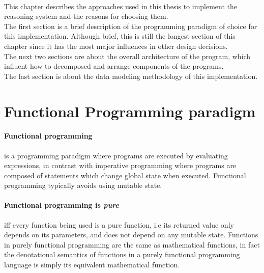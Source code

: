 \documentclass[../gr-final.tex]{subfiles}
\begin{document}
\paragraph{} This chapter describes the approaches used in this thesis
to implement the reasoning system and the reasons for choosing them.\\
The first section is a brief description of the
programming paradigm of choice for this implementation. Although
brief, this is still the longest section of this chapter since
it has the most major influences in other design decisions.\\
The next two sections are about the overall architecture of the
program, which influent how to decomposed and arrange components
of the programs.\\
The last section is about the data modeling methodology of this
implementation. 
\section{Functional Programming paradigm}
\paragraph {Functional programming}is a programming paradigm where
programs are executed by evaluating expressions, in contrast with
imperative programming where programs are composed of statements
which change global state when executed. Functional programming
typically avoids using mutable state. 
\paragraph {Functional programming is {\it{\bfseries pure}}}iff every function being used is a pure function, i.e
its returned value only depends on its parameters, and does not
depend on any mutable state. Functions in purely functional
programming are the same as mathematical functions, in fact the
denotational semantics of functions in a purely functional
programming language is simply its equivalent mathematical function.
\end{document}
